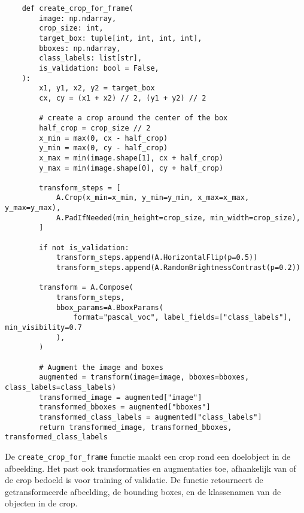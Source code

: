 \begin{listing}[H]
  \fontsize{12pt}{10pt}
  \begin{verbatim}
    def create_crop_for_frame(
        image: np.ndarray,
        crop_size: int,
        target_box: tuple[int, int, int, int],
        bboxes: np.ndarray,
        class_labels: list[str],
        is_validation: bool = False,  
    ):
        x1, y1, x2, y2 = target_box
        cx, cy = (x1 + x2) // 2, (y1 + y2) // 2

        # create a crop around the center of the box
        half_crop = crop_size // 2
        x_min = max(0, cx - half_crop)
        y_min = max(0, cy - half_crop)
        x_max = min(image.shape[1], cx + half_crop)
        y_max = min(image.shape[0], cy + half_crop)

        transform_steps = [
            A.Crop(x_min=x_min, y_min=y_min, x_max=x_max, y_max=y_max),
            A.PadIfNeeded(min_height=crop_size, min_width=crop_size),
        ]

        if not is_validation:
            transform_steps.append(A.HorizontalFlip(p=0.5))
            transform_steps.append(A.RandomBrightnessContrast(p=0.2))

        transform = A.Compose(
            transform_steps,
            bbox_params=A.BboxParams(
                format="pascal_voc", label_fields=["class_labels"], min_visibility=0.7
            ),
        )

        # Augment the image and boxes
        augmented = transform(image=image, bboxes=bboxes, class_labels=class_labels)
        transformed_image = augmented["image"]
        transformed_bboxes = augmented["bboxes"]
        transformed_class_labels = augmented["class_labels"]
        return transformed_image, transformed_bboxes, transformed_class_labels
  \end{verbatim}
  \caption[Functie voor het creëren van een crop rond een doelobject]{
    \label{listing:create-crop-frame}
    De \texttt{create\_crop\_for\_frame} functie maakt een crop rond een doelobject in de afbeelding.
    Het past ook transformaties en augmentaties toe, afhankelijk van of de crop bedoeld is voor training of validatie.
    De functie retourneert de getransformeerde afbeelding, de bounding boxes, en de klassenamen van de objecten in de crop.
    }
\end{listing}


